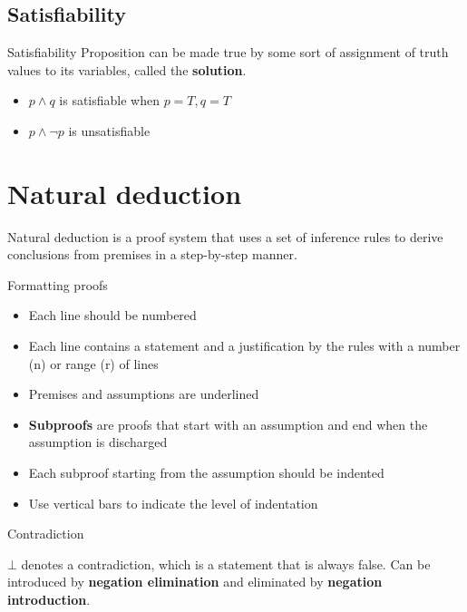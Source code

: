 \documentclass{article}
\begin{document}
\subsection{Satisfiability}

\begin{theorem}{Satisfiability}
    Proposition can be made true by some sort of assignment of truth values to its variables, called the \textbf{solution}.

    \tcblower
    \begin{itemize}
        \item $p \land q$ is satisfiable when $p = T, q = T$
        \item $p \land \neg p$ is unsatisfiable
    \end{itemize}
\end{theorem}

\section{Natural deduction}

Natural deduction is a proof system that uses a set of inference rules to derive conclusions from premises in a step-by-step manner.

\begin{knBox}
    {Formatting proofs}
    \begin{itemize}
        \item Each line should be numbered
        \item Each line contains a statement and a justification by the rules with a number (n) or range (r) of lines
        \item Premises and assumptions are underlined
        \item \textbf{Subproofs} are proofs that start with an assumption and end when the assumption is discharged
        \item Each subproof starting from the assumption should be indented
        \item Use vertical bars to indicate the level of indentation
    \end{itemize}
\end{knBox}

\begin{theorem}
    {Contradiction}

    $\bot$ denotes a contradiction, which is a statement that is always false. Can be introduced by \textbf{negation elimination} and eliminated by \textbf{negation introduction}.
\end{theorem}
\end{document}
